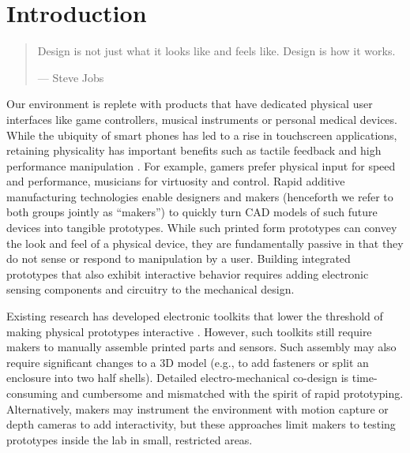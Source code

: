 \chapter{Introduction}

\begin{quote}
Design is not just what it looks like and feels like. Design is how it works.

--- Steve Jobs
\end{quote}

Our environment is replete with products that have dedicated physical user interfaces like game controllers, musical instruments or personal medical devices. While the ubiquity of smart phones has led to a rise in touchscreen applications, retaining physicality has important benefits such as tactile feedback and high performance manipulation \cite{klemmer-bodies}. For example, gamers prefer physical input for speed and performance, musicians for virtuosity and control. Rapid additive manufacturing technologies enable designers and makers (henceforth we refer to both groups jointly as ``makers'') to quickly turn CAD models of such future devices into tangible prototypes. While such printed form prototypes can convey the look and feel of a physical device, they are fundamentally passive in that they do not sense or respond to manipulation by a user. Building integrated prototypes that also exhibit interactive behavior requires adding electronic sensing components and circuitry to the mechanical design.

Existing research has developed electronic toolkits that lower the threshold of making physical prototypes interactive \cite{arduino,greenberg-phidgets}. However, such toolkits still require makers to manually assemble printed parts and sensors. Such assembly may also require significant changes to a 3D model (e.g., to add fasteners or split an enclosure into two half shells). Detailed electro-mechanical co-design is time-consuming and cumbersome and mismatched with the spirit of rapid prototyping. Alternatively, makers may instrument the environment with motion capture \cite{akaoka-displayobjects} or depth cameras \cite{wilson-depthtouch} to add interactivity, but these approaches limit makers to testing prototypes inside the lab in small, restricted areas.


